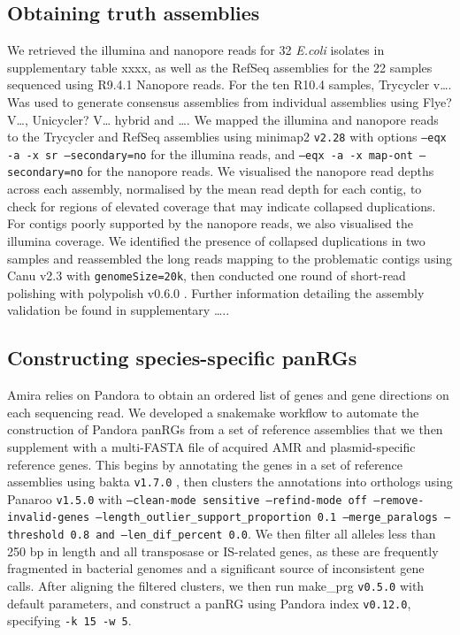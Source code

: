 \subsection*{Obtaining truth assemblies}

We retrieved the illumina and nanopore reads for 32 \textit{E.coli} isolates in supplementary table xxxx, as well as the RefSeq assemblies for the 22 samples sequenced using R9.4.1 Nanopore reads. For the ten R10.4 samples, Trycycler v…. Was used to generate consensus assemblies from individual assemblies using Flye? V…, Unicycler? V… hybrid and …. We mapped the illumina and nanopore reads to the Trycycler and RefSeq assemblies using minimap2 \texttt{v2.28} \cite{10.1093/bioinformatics/bty191} with options \texttt{--eqx -a -x sr --secondary=no} for the illumina reads, and \texttt{--eqx -a -x map-ont --secondary=no} for the nanopore reads. We visualised the nanopore read depths across each assembly, normalised by the mean read depth for each contig, to check for regions of elevated coverage that may indicate collapsed duplications. For contigs poorly supported by the nanopore reads, we also visualised the illumina coverage. We identified the presence of collapsed duplications in two samples and reassembled the long reads mapping to the problematic contigs using Canu v2.3 \cite{Koren2017} with \texttt{genomeSize=20k}, then conducted one round of short-read polishing with polypolish v0.6.0 \cite{10.1099/mgen.0.001254}. Further information detailing the assembly validation be found in supplementary …..

\subsection*{Constructing species-specific panRGs}

Amira relies on Pandora \cite{pandora} to obtain an ordered list of genes and gene directions on each sequencing read. We developed a snakemake \cite{10.1093/bioinformatics/bts480} workflow to automate the construction of Pandora panRGs from a set of reference assemblies that we then supplement with a multi-FASTA file of acquired AMR and plasmid-specific reference genes. This begins by annotating the genes in a set of reference assemblies using bakta \texttt{v1.7.0} \cite{Schwengers2021}, then clusters the annotations into orthologs using Panaroo \texttt{v1.5.0} \cite{panaroo}  with \texttt{--clean-mode sensitive --refind-mode off --remove-invalid-genes --length\_outlier\_support\_proportion 0.1 --merge\_paralogs --threshold 0.8 and --len\_dif\_percent 0.0}. We then filter all alleles less than 250 bp in length and all transposase or IS-related genes, as these are frequently fragmented in bacterial genomes and a significant source of inconsistent gene calls. After aligning the filtered clusters, we then run make\_prg \texttt{v0.5.0} with default parameters, and construct a panRG using Pandora \cite{pandora} index \texttt{v0.12.0}, specifying \texttt{-k 15 -w 5}. 

